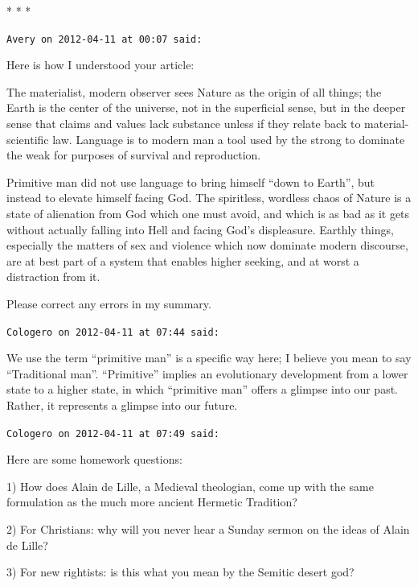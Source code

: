 
\begin{center}* * *\end{center}

\begin{footnotesize}
\begin{sffamily}
\texttt{Avery on 2012-04-11 at 00:07 said:}

Here is how I understood your article:

The materialist, modern observer sees Nature as the origin of all things; the Earth is the center of the universe, not in the superficial sense, but in the deeper sense that claims and values lack substance unless if they relate back to material-scientific law. Language is to modern man a tool used by the strong to dominate the weak for purposes of survival and reproduction.

Primitive man did not use language to bring himself ``down to Earth'', but instead to elevate himself facing God. The spiritless, wordless chaos of Nature is a state of alienation from God which one must avoid, and which is as bad as it gets without actually falling into Hell and facing God's displeasure. Earthly things, especially the matters of sex and violence which now dominate modern discourse, are at best part of a system that enables higher seeking, and at worst a distraction from it.

Please correct any errors in my summary.

\hfill

\texttt{Cologero on 2012-04-11 at 07:44 said:}

We use the term ``primitive man'' is a specific way here; I believe you mean to say ``Traditional man''. ``Primitive'' implies an evolutionary development from a lower state to a higher state, in which ``primitive man'' offers a glimpse into our past. Rather, it represents a glimpse into our future.

\hfill

\texttt{Cologero on 2012-04-11 at 07:49 said:}

Here are some homework questions:

1) How does Alain de Lille, a Medieval theologian, come up with the same formulation as the much more ancient Hermetic Tradition?

2) For Christians: why will you never hear a Sunday sermon on the ideas of Alain de Lille?

3) For new rightists: is this what you mean by the Semitic desert god?


\end{sffamily}
\end{footnotesize}
